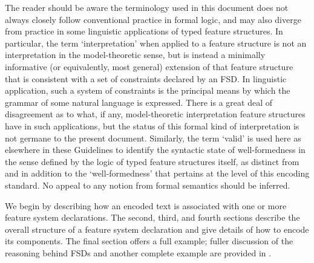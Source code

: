 The reader should be aware the terminology used in this document does not always closely follow conventional practice in formal logic, and may also diverge from practice in some linguistic applications of typed feature structures. In particular, the term ‘interpretation’ when applied to a feature structure is not an interpretation in the model-theoretic sense, but is instead a minimally informative (or equivalently, most general) extension  of that feature structure that is consistent with a set of constraints declared by an FSD. In linguistic application, such a system of constraints is the principal means by which the grammar of some natural language is expressed. There is a great deal of disagreement as to what, if any, model-theoretic interpretation feature structures have in such applications, but the status of this formal kind of interpretation is not germane to the present document. Similarly, the term ‘valid’ is used here as elsewhere in these Guidelines to identify the syntactic state of well-formedness in the sense defined by the logic of typed feature structures itself, as distinct from and in addition to the ‘well-formedness’ that pertains at the level of this encoding standard. No appeal to any notion from formal semantics should be inferred.\par
We begin by describing how an encoded text is associated with one or more feature system declarations. The second, third, and fourth sections describe the overall structure of a feature system declaration and give details of how to encode its components. The final section offers a full example; fuller discussion of the reasoning behind FSDs and another complete example are provided in \cite{FS-BIBL-01}.

